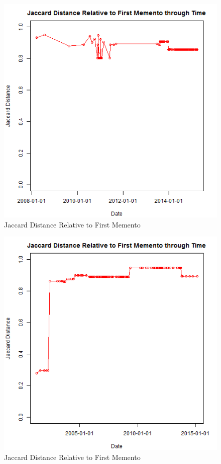 \documentclass[12pt]{Report}
\begin{document}
\begin{figure}[ht]    
    \begin{center}
        \includegraphics[scale=0.60]{link11.png}
        \caption{Jaccard Distance Relative to First Memento }
        \label{Jaccard Distance Relative to First Memento}
    \end{center}
\end{figure}
\newpage

\begin{figure}[ht]    
    \begin{center}
        \includegraphics[scale=0.60]{link14.png}
        \caption{Jaccard Distance Relative to First Memento }
        \label{Jaccard Distance Relative to First Memento}
    \end{center}
\end{figure}
\newpage
\end{document}
